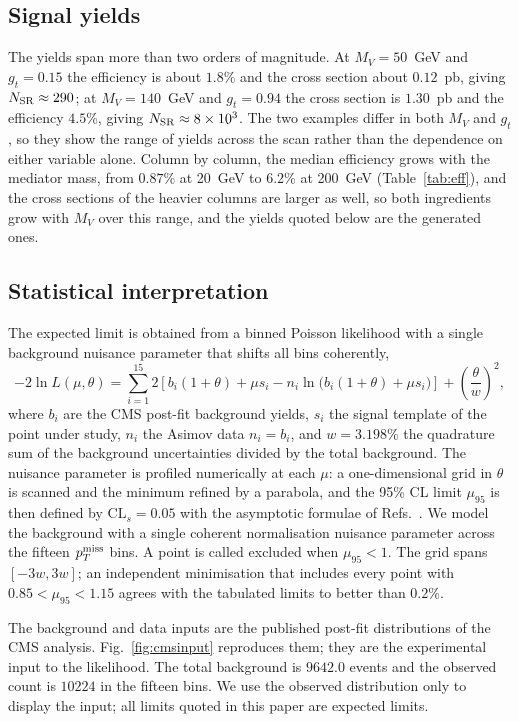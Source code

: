 \subsection{Signal yields}

The yields span more than two orders of magnitude. At $M_V=50$~GeV and $g_t=0.15$ the efficiency is about $1.8\%$ and the cross section about $0.12$~pb, giving $N_{\rm SR}\approx290$; at $M_V=140$~GeV and $g_t=0.94$ the cross section is $1.30$~pb and the efficiency $4.5\%$, giving $N_{\rm SR}\approx8\times10^3$. The two examples differ in both $M_V$ and $g_t$, so they show the range of yields across the scan rather than the dependence on either variable alone. Column by column, the median efficiency grows with the mediator mass, from $0.87\%$ at 20~GeV to $6.2\%$ at 200~GeV (Table~\ref{tab:eff}), and the cross sections of the heavier columns are larger as well, so both ingredients grow with $M_V$ over this range, and the yields quoted below are the generated ones.

\subsection{Statistical interpretation}

The expected limit is obtained from a binned Poisson likelihood with a single background nuisance parameter that shifts all bins coherently,
\begin{equation}
-2\ln L(\mu,\theta)=\sum_{i=1}^{15}2\left[b_i(1+\theta)+\mu s_i-n_i\ln\!\big(b_i(1+\theta)+\mu s_i\big)\right]+\left(\frac{\theta}{w}\right)^2,
\label{eq:lik}
\end{equation}
where $b_i$ are the CMS post-fit background yields, $s_i$ the signal template of the point under study, $n_i$ the Asimov data $n_i=b_i$, and $w=3.198\%$ the quadrature sum of the background uncertainties divided by the total background. The nuisance parameter is profiled numerically at each $\mu$: a one-dimensional grid in $\theta$ is scanned and the minimum refined by a parabola, and the 95\% CL limit $\mu_{95}$ is then defined by $\mathrm{CL}_s=0.05$ with the asymptotic formulae of Refs.~\cite{CLS,CCGV}. We model the background with a single coherent normalisation nuisance parameter across the fifteen $p_T^{\rm miss}$ bins. A point is called excluded when $\mu_{95}<1$. The grid spans $[-3w,3w]$; an independent minimisation that includes every point with $0.85<\mu_{95}<1.15$ agrees with the tabulated limits to better than $0.2\%$.

The background and data inputs are the published post-fit distributions of the CMS analysis. Fig.~\ref{fig:cmsinput} reproduces them; they are the experimental input to the likelihood. The total background is $9642.0$ events and the observed count is $10224$ in the fifteen bins. We use the observed distribution only to display the input; all limits quoted in this paper are expected limits.
